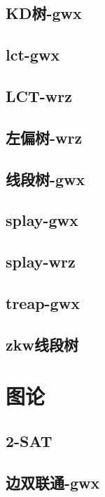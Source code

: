 \documentclass[titlepage,a4paper,10pt]{article}
\begin{document}
\begin{spacing}{0.8}
			\subsection{KD树-gwx}
				
			\subsection{lct-gwx}
				
			\subsection{LCT-wrz}
				
			\subsection{左偏树-wrz}
				
			\subsection{线段树-gwx}
				
			\subsection{splay-gwx}
				
			\subsection{splay-wrz}
				
			\subsection{treap-gwx}
				
			\subsection{zkw线段树}
				
		\section{图论}
			\subsection{2-SAT}
				
			\subsection{边双联通-gwx}
				

\end{spacing}
\end{document}
